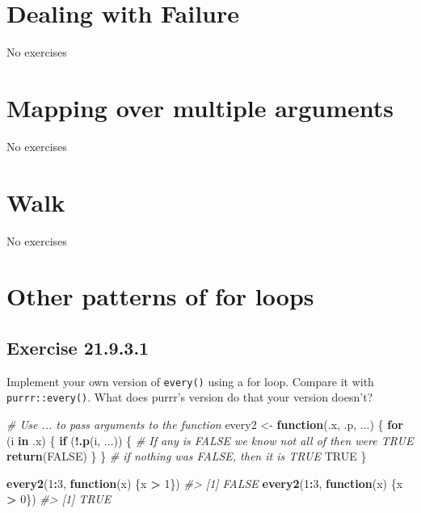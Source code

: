 \documentclass[]{book}
\newenvironment{Shaded}{\begin{snugshade}}{\end{snugshade}}
\newcommand{\CommentTok}[1]{\textcolor[rgb]{0.56,0.35,0.01}{\textit{#1}}}
\newcommand{\ControlFlowTok}[1]{\textcolor[rgb]{0.13,0.29,0.53}{\textbf{#1}}}
\newcommand{\DecValTok}[1]{\textcolor[rgb]{0.00,0.00,0.81}{#1}}
\newcommand{\KeywordTok}[1]{\textcolor[rgb]{0.13,0.29,0.53}{\textbf{#1}}}
\newcommand{\NormalTok}[1]{#1}
\newcommand{\OperatorTok}[1]{\textcolor[rgb]{0.81,0.36,0.00}{\textbf{#1}}}
\newcommand{\OtherTok}[1]{\textcolor[rgb]{0.56,0.35,0.01}{#1}}
\newcommand{\StringTok}[1]{\textcolor[rgb]{0.31,0.60,0.02}{#1}}
\theoremstyle{plain}
\theoremstyle{remark}
\begin{document}
\hypertarget{dealing-with-failure}{%
\section{Dealing with Failure}\label{dealing-with-failure}}

No exercises

\hypertarget{mapping-over-multiple-arguments}{%
\section{Mapping over multiple arguments}\label{mapping-over-multiple-arguments}}

No exercises

\hypertarget{walk}{%
\section{Walk}\label{walk}}

No exercises

\hypertarget{other-patterns-of-for-loops}{%
\section{Other patterns of for loops}\label{other-patterns-of-for-loops}}

\hypertarget{exercise-21.9.3.1}{%
\subsection*{\texorpdfstring{Exercise {21.9.3.1}}{Exercise 21.9.3.1}}\label{exercise-21.9.3.1}}

Implement your own version of \texttt{every()} using a for loop.
Compare it with \texttt{purrr::every()}.
What does purrr's version do that your version doesn't?

\begin{Shaded}
\begin{Highlighting}[]
\CommentTok{# Use ... to pass arguments to the function}
\NormalTok{every2 <-}\StringTok{ }\ControlFlowTok{function}\NormalTok{(.x, .p, ...) \{}
  \ControlFlowTok{for}\NormalTok{ (i }\ControlFlowTok{in}\NormalTok{ .x) \{}
    \ControlFlowTok{if}\NormalTok{ (}\OperatorTok{!}\KeywordTok{.p}\NormalTok{(i, ...)) \{}
      \CommentTok{# If any is FALSE we know not all of then were TRUE}
      \KeywordTok{return}\NormalTok{(}\OtherTok{FALSE}\NormalTok{)}
\NormalTok{    \}}
\NormalTok{  \}}
  \CommentTok{# if nothing was FALSE, then it is TRUE}
  \OtherTok{TRUE}  
\NormalTok{\}}

\KeywordTok{every2}\NormalTok{(}\DecValTok{1}\OperatorTok{:}\DecValTok{3}\NormalTok{, }\ControlFlowTok{function}\NormalTok{(x) \{x }\OperatorTok{>}\StringTok{ }\DecValTok{1}\NormalTok{\})}
\CommentTok{#> [1] FALSE}
\KeywordTok{every2}\NormalTok{(}\DecValTok{1}\OperatorTok{:}\DecValTok{3}\NormalTok{, }\ControlFlowTok{function}\NormalTok{(x) \{x }\OperatorTok{>}\StringTok{ }\DecValTok{0}\NormalTok{\})}
\CommentTok{#> [1] TRUE}
\end{Highlighting}
\end{Shaded}
\end{document}
